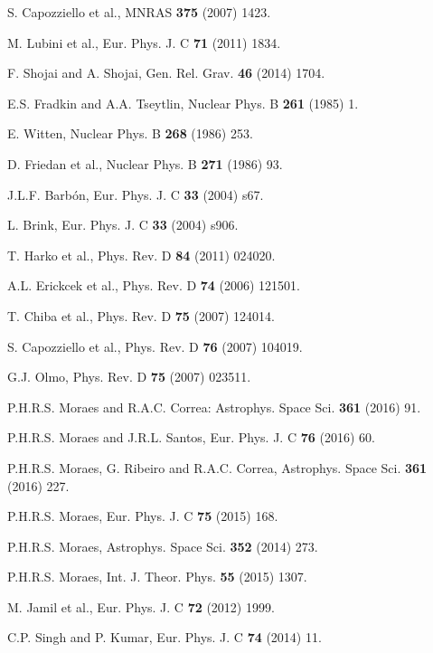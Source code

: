 \begin{thebibliography}{99}
 S. Capozziello et al., MNRAS \textbf{375} (2007)
1423. 

 M. Lubini et al., Eur. Phys. J. C \textbf{71} (2011)
1834.

 F. Shojai and A. Shojai, Gen. Rel. Grav. \textbf{46}
(2014) 1704.

 E.S. Fradkin and A.A. Tseytlin, Nuclear Phys. B 
\textbf{261} (1985) 1.

 E. Witten, Nuclear Phys. B \textbf{268} (1986) 253.

 D. Friedan et al., Nuclear Phys. B \textbf{271}
(1986) 93.

 J.L.F. Barb\'on, Eur. Phys. J. C \textbf{33} (2004)
s67.

 L. Brink, Eur. Phys. J. C \textbf{33} (2004) s906.

 T. Harko et al., Phys. Rev. D \textbf{84} (2011) 024020.

 A.L. Erickcek et al., Phys. Rev. D \textbf{74}
(2006) 121501.

 T. Chiba et al., Phys. Rev. D \textbf{75} (2007) 124014.

 S. Capozziello et al., Phys. Rev. D \textbf{76}
(2007) 104019.

 G.J. Olmo, Phys. Rev. D \textbf{75} (2007) 023511.

 P.H.R.S. Moraes and R.A.C. Correa: Astrophys. Space Sci. 
\textbf{361} (2016) 91.

 P.H.R.S. Moraes and J.R.L. Santos, Eur. Phys. J. C \textbf{%
76} (2016) 60.

 P.H.R.S. Moraes, G. Ribeiro and R.A.C. Correa, Astrophys.
Space Sci. \textbf{361} (2016) 227.

 P.H.R.S. Moraes, Eur. Phys. J. C \textbf{75} (2015)
168.

 P.H.R.S. Moraes, Astrophys. Space Sci. \textbf{352}
(2014) 273.

 P.H.R.S. Moraes, Int. J. Theor. Phys. \textbf{55}
(2015) 1307.

 M. Jamil et al., Eur. Phys. J. C \textbf{72} (2012)
1999.

 C.P. Singh and P. Kumar, Eur. Phys. J. C \textbf{74}
(2014) 11.


\end{thebibliography}
